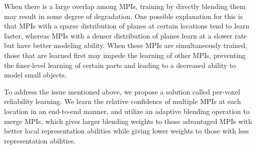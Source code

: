 \documentclass[letterpaper, 10 pt, conference]{ieeeconf}  %
\begin{document}
When there is a large overlap among MPIs, training by directly blending them may result in some degree of degradation. One possible explanation for this is that MPIs with a sparse distribution of planes at certain locations tend to learn faster, whereas MPIs with a denser distribution of planes learn at a slower rate but have better modeling ability. When these MPIs are simultaneously trained, those that are learned first may impede the learning of other MPIs, preventing the finer-level learning of certain parts and leading to a decreased ability to model small objects.

To address the issue mentioned above, we propose a solution called per-voxel reliability learning. We learn the relative confidence of multiple MPIs at each location in an end-to-end manner, and utilize an adaptive blending operation to merge MPIs, which gives larger blending weights to those advantaged MPIs with better local representation abilities while giving lower weights to those with less representation abilities.
\end{document}
